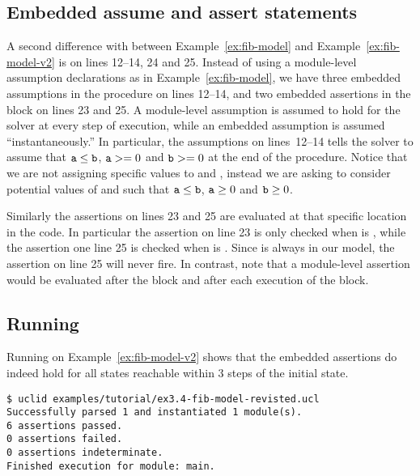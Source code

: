 \subsection{Embedded assume and assert statements}

A second difference with between Example~\ref{ex:fib-model} and Example~\ref{ex:fib-model-v2} is on lines 12--14, 24 and 25.  Instead of using a module-level assumption declarations as in Example~\ref{ex:fib-model}, we have three embedded assumptions in the  procedure on lines 12--14, and two embedded assertions in the  block on lines 23 and 25. A module-level assumption is assumed to hold for the solver at every step of execution, while an embedded assumption is assumed ``instantaneously.'' In particular, the assumptions on lines~12--14 tells the solver to assume that $\texttt{a} \leq \texttt{b}$, $\texttt{a} >= 0$ and $\texttt{b} >= 0$ at the end of the  procedure. Notice that we are not assigning specific values to  and , instead we are asking \uclid{} to consider potential values of  and  such that $\texttt{a} \leq \texttt{b}$, $\texttt{a} \geq 0$ and $\texttt{b} \geq 0$.

Similarly the assertions on lines 23 and 25 are evaluated at that specific location in the code. In particular the assertion on line 23 is only checked when  is , while the assertion one line 25 is checked when  is . Since  is always  in our model, the assertion on line 25 will never fire. In contrast, note that a module-level assertion would be evaluated after the  block and after each execution of the  block.

\subsection{Running \uclid{}}

Running \uclid{} on Example~\ref{ex:fib-model-v2} shows that the embedded assertions do indeed hold for all states reachable within 3 steps of the initial state.

\begin{Verbatim}[frame=single, samepage=true]
$ uclid examples/tutorial/ex3.4-fib-model-revisted.ucl 
Successfully parsed 1 and instantiated 1 module(s).
6 assertions passed.
0 assertions failed.
0 assertions indeterminate.
Finished execution for module: main.
\end{Verbatim}


